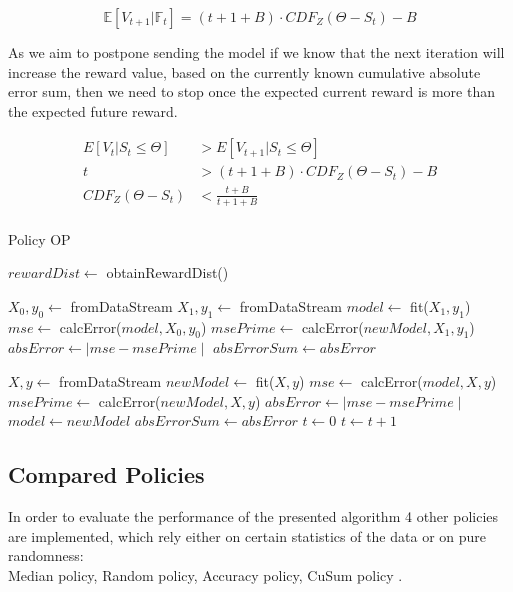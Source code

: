 \documentclass{mpaper}
\begin{document}
\begin{equation}
    \mathbb{E}[V_{t+1}|\mathbb{F}_{t}] = (t+1+B) \cdot CDF_{Z}(\Theta - S_t) - B
\end{equation}

As we aim to postpone sending the model if we know that the next iteration will increase the reward value, based on the currently known cumulative absolute error sum, then we need to stop once the expected current reward is more than the expected future reward.

\begin{align*}
    E[V_{t}|S_t\leq\Theta] &> E[V_{t+1}|S_t\leq\Theta]\\
    t &> (t+1+B)\cdot CDF_{Z}(\Theta - S_t) - B\\
    CDF_{Z}(\Theta - S_t) &< \frac{t+B}{t+1+B}\\
\end{align*}

\begin{algorithm}
\caption{Policy OP}\label{polOP}
\begin{algorithmic}
\State $rewardDist \gets$ obtainRewardDist() 

\State $X_0, y_0 \gets$ fromDataStream
\State $X_1, y_1 \gets$ fromDataStream
\State $model \gets$ fit($X_1, y_1$)
\State $mse \gets$ calcError($model,X_0,y_0$)
\State $msePrime \gets$ calcError($newModel,X_1,y_1$)
\State $absError \gets \mid mse - msePrime \mid$
\State $absErrorSum \gets absError$

    \State $X, y \gets$ fromDataStream
    \State $newModel \gets$ fit($X,y$)
    \State $mse \gets$ calcError($model,X,y$)
    \State $msePrime \gets$ calcError($newModel,X,y$)
    \State $absError \gets \mid mse - msePrime \mid$
        \State $model \gets newModel$ 
        \State $absErrorSum \gets absError$
        \State $t \gets 0$
    \EndIf
    \State $t \gets t + 1$
\EndWhile
\end{algorithmic}
\end{algorithm}

\subsection{Compared Policies}

In order to evaluate the performance of the presented algorithm 4 other policies are implemented, which rely either on certain statistics of the data or on pure randomness:\\
Median policy, Random policy, Accuracy policy, CuSum policy \cite{cusum_pierre}.
\end{document}
